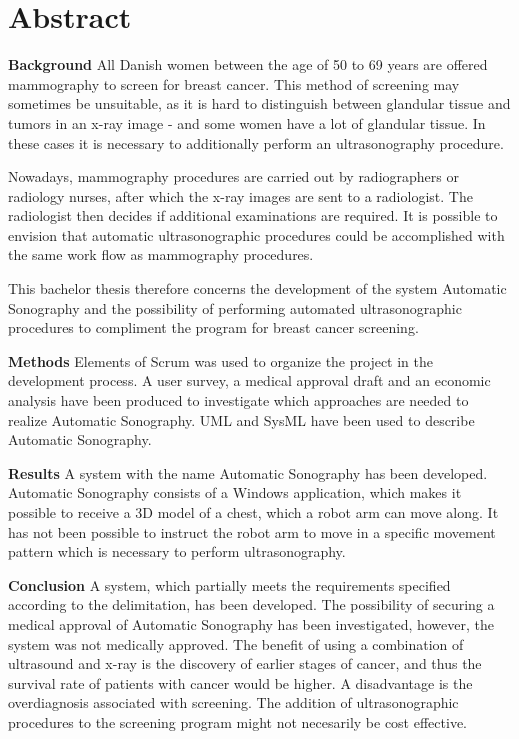 \chapter{Abstract}\label{kapitel_Abstract}
\textbf{Background}
All Danish women between the age of 50 to 69 years are offered 
mammography to screen for breast cancer. This method of screening may sometimes be unsuitable, as it is hard to distinguish between glandular tissue and tumors in an x-ray image - and some women have a lot of glandular tissue. In these cases it is necessary to additionally perform an ultrasonography procedure.

Nowadays, mammography procedures are carried out by radiographers or radiology nurses, after which the x-ray images are sent to a radiologist. The radiologist then decides if additional examinations are required. It is possible to envision that automatic ultrasonographic procedures could be accomplished with the same work flow as mammography procedures.

This bachelor thesis therefore concerns the development of the system Automatic Sonography and the possibility of performing automated ultrasonographic procedures to compliment the program for breast cancer screening.

\textbf{Methods}
Elements of Scrum was used to organize the project in the development process. A user survey, a medical approval draft and an economic analysis have been produced to investigate which approaches are needed to realize Automatic Sonography. UML and SysML have been used to describe Automatic Sonography.

\textbf{Results}
A system with the name Automatic Sonography has been developed. Automatic Sonography consists of a Windows application, which makes it possible to receive a 3D model of a chest, which a robot arm can move along. It has not been possible to instruct the robot arm to move in a specific movement pattern which is necessary to perform ultrasonography.

\textbf{Conclusion}
A system, which partially meets the requirements specified according to the delimitation, has been developed. The possibility of securing a medical approval of Automatic Sonography has been investigated, however, the system was not medically approved. The benefit of using a combination of ultrasound and x-ray is the discovery of earlier stages of cancer, and thus the survival rate of patients with cancer would be higher. A disadvantage is the overdiagnosis associated with screening. The addition of ultrasonographic procedures to the screening program might not necesarily be cost effective.